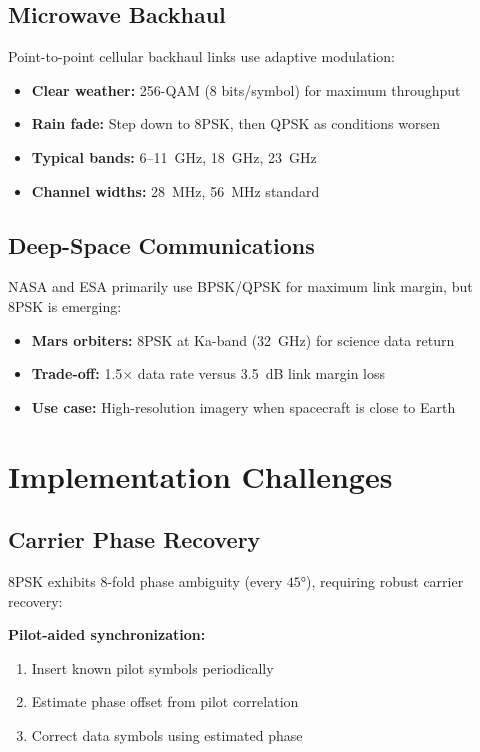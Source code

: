 \subsection{Microwave Backhaul}

Point-to-point cellular backhaul links use adaptive modulation:
\begin{itemize}
\item \textbf{Clear weather:} 256-QAM (8 bits/symbol) for maximum throughput
\item \textbf{Rain fade:} Step down to 8PSK, then QPSK as conditions worsen
\item \textbf{Typical bands:} 6--11~GHz, 18~GHz, 23~GHz
\item \textbf{Channel widths:} 28~MHz, 56~MHz standard
\end{itemize}

\subsection{Deep-Space Communications}

NASA and ESA primarily use BPSK/QPSK for maximum link margin, but 8PSK is emerging:
\begin{itemize}
\item \textbf{Mars orbiters:} 8PSK at Ka-band (32~GHz) for science data return
\item \textbf{Trade-off:} 1.5$\times$ data rate versus 3.5~dB link margin loss
\item \textbf{Use case:} High-resolution imagery when spacecraft is close to Earth
\end{itemize}

\section{Implementation Challenges}

\subsection{Carrier Phase Recovery}

8PSK exhibits 8-fold phase ambiguity (every $45°$), requiring robust carrier recovery:

\textbf{Pilot-aided synchronization:}
\begin{enumerate}
\item Insert known pilot symbols periodically
\item Estimate phase offset from pilot correlation
\item Correct data symbols using estimated phase
\end{enumerate}

